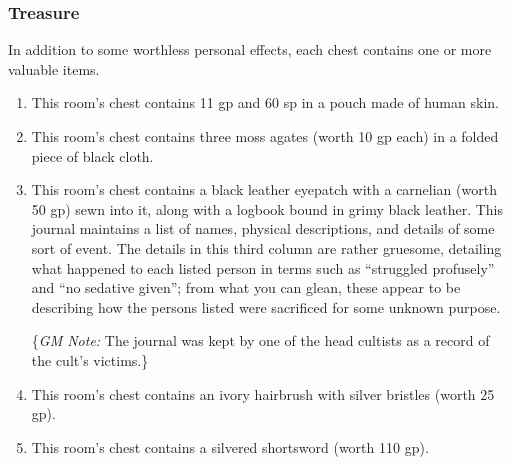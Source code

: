 \subsubsection*{Treasure}
In addition to some worthless personal effects, each chest contains one or more valuable items.
\begin{enumerate}[label={\textit{25\Alph*.}}]
  \item This room's chest contains 11 gp and 60 sp in a pouch made of human skin.
  \item This room's chest contains three moss agates (worth 10 gp each) in a folded piece of black cloth.
  \item This room's chest contains a black leather eyepatch with a carnelian (worth 50 gp) sewn into it, along
      with a logbook bound in grimy black leather. This journal maintains a list of names, physical
      descriptions, and details of some sort of event. The details in this third column are rather gruesome,
      detailing what happened to each listed person in terms such as ``struggled profusely'' and ``no sedative 
      given''; from what you can glean, these appear to be describing how the persons listed were sacrificed
      for some unknown purpose.
      
      \{\textit{GM Note:} The journal was kept by one of the head cultists as a record of the cult's victims.\}
  \item This room's chest contains an ivory hairbrush with silver bristles (worth 25 gp).
  \item This room's chest contains a silvered shortsword (worth 110 gp).
\end{enumerate}

\begin{arealinks}
\end{arealinks}


\pagebreak
